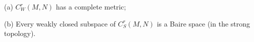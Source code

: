 (a) $C^r_W(M,N)$ has a complete metric;

(b) Every weakly closed subspace of $C^r_S(M,N)$ is a Baire space (in the strong topology).
